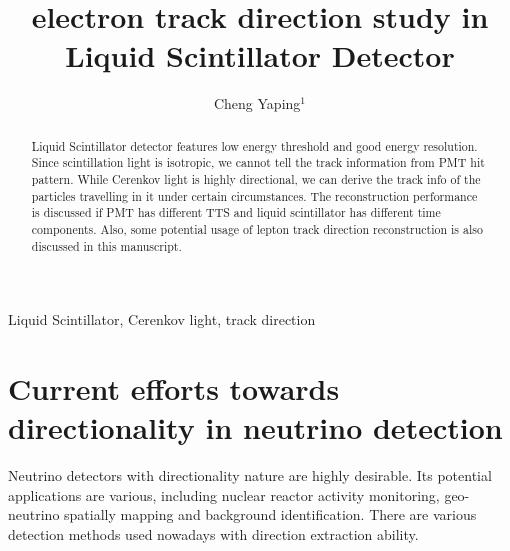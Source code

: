 \documentclass[a4paper,10pt]{cpc-hepnp}
\begin{document}
\title{electron track direction study in Liquid Scintillator Detector}

\author{%
      Cheng Yaping$^{1}$%
}
\maketitle
\address{%
$^1$ Institute of High Energy Physics, Chinese
        Academy of Sciences, Beijing 100049, China\\
}


\begin{abstract}
Liquid Scintillator detector features low energy threshold
and good energy resolution. Since scintillation light is isotropic,
we cannot tell the track information from PMT hit pattern.
While Cerenkov light is highly directional, we can derive the track
info of the particles travelling in it under certain circumstances.
The reconstruction performance is discussed if PMT has different TTS and
liquid scintillator has different time components. Also, some potential
usage of lepton track direction reconstruction is also discussed in this manuscript.
\end{abstract}


\begin{keyword}
Liquid Scintillator, Cerenkov light, track direction
\end{keyword}



\tableofcontents
\section{Current efforts towards directionality in neutrino detection}
Neutrino detectors with directionality nature are highly desirable.
Its potential applications are various, including nuclear reactor activity monitoring,
geo-neutrino spatially mapping and background identification.
There are various detection methods used nowadays with direction extraction
ability.
\end{document}
